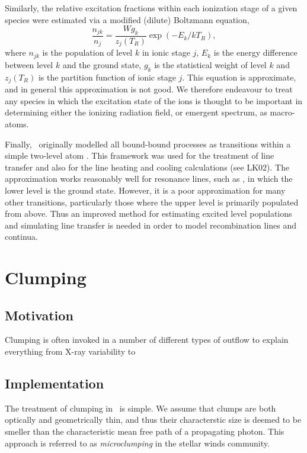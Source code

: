Similarly, the relative excitation fractions within each ionization
stage of a given species were estimated via a modified (dilute) Boltzmann
equation,
\begin{equation}
\frac{n_{jk}}{n_j} = \frac{W g_k}{z_j(T_R)} \exp(-E_k/kT_R),
\end{equation}
where $n_{jk}$ is the population of level $k$ in ionic stage $j$,
$E_k$ is the energy difference between level $k$ and the ground state,
$g_k$ is the statistical weight of level $k$
and $z_j(T_R)$ is the partition function of ionic stage $j$. 
This equation is approximate, and in general this approximation 
is not good. We therefore endeavour to treat any species in
which the excitation state of the ions is thought to be important
in determining either the ionizing radiation field, or emergent spectrum,
as macro-atoms.

Finally, \py\ originally modelled all bound-bound processes as transitions
within a simple two-level atom \cite[e.g.][]{mihalas}. 
This framework was used for the treatment of line transfer and also
for the line heating and cooling calculations (see LK02). 
The approximation works reasonably well for resonance  
lines, such as \civfull, in which the lower level is the ground state.  
However, it is a poor approximation for many other
transitions, particularly those where the upper level
is primarily populated from above. Thus an improved method for
estimating excited level populations and simulating line transfer is
needed in order to model recombination lines and continua.






\section{Clumping}

\subsection{Motivation}

Clumping is often invoked in a number of different types of outflow
to explain everything from X-ray variability to 


\subsection{Implementation}

The treatment of clumping in \py\ is simple. We assume
that clumps are both optically and geometrically thin, and thus their 
characterstic size is deemed to be smeller than the characteristic mean 
free path of a propagating photon. This approach is referred to as {\em microclumping}
in the stellar winds community. 